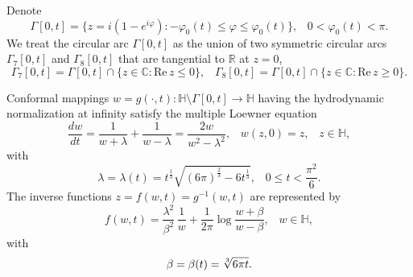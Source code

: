 \documentclass[
11pt,%
tightenlines,%
twoside,%
onecolumn,%
nofloats,%
nobibnotes,%
nofootinbib,%
superscriptaddress,%
noshowpacs,%
centertags]%
{revtex4}
\begin{document}
Denote $$\Gamma[0,t]=\{z=i(1-e^{i\varphi}):-\varphi_0(t)\leq\varphi\leq\varphi_0(t)\},\;\;\;0<\varphi_0(t)<\pi.$$ We treat the circular arc $\Gamma[0,t]$ as the union of two symmetric circular arcs $\Gamma_7[0,t]$ and $\Gamma_8[0,t]$ that are tangential to $\mathbb R$ at $z=0$, $$\Gamma_7[0,t]=\Gamma[0,t]\cap\{z\in\mathbb C:\text{Re}\,z\leq0\},\;\;\;\Gamma_8[0,t]=\Gamma[0,t]\cap\{z\in\mathbb C:\text{Re}\,z\geq0\}.$$

\begin{theorem}
Conformal mappings $w=g(\cdot,t):\mathbb H\setminus\Gamma[0,t]\to\mathbb H$ having the hydrodynamic normalization at infinity satisfy the multiple Loewner equation $$\frac{dw}{dt}=\frac{1}{w+\lambda}+\frac{1}{w-\lambda}=\frac{2w}{w^2-\lambda^2},\;\;\;w(z,0)=z,\;\;\;z\in\mathbb H,$$ with $$\lambda=\lambda(t)=t^{\frac{1}{3}}\sqrt{(6\pi)^{\frac{2}{3}}-6t^{\frac{1}{3}}},\;\;\;0\leq t<\frac{\pi^2}{6}.$$ The inverse functions $z=f(w,t)=g^{-1}(w,t)$ are represented by $$f(w,t)=\frac{\lambda^2}{\beta^2}\,\frac{1}{w}+\frac{1}{2\pi}\log\frac{w+\beta}{w-\beta},\;\;\;w\in\mathbb H,$$ with $$\beta=\beta(t)=\root3\of{6\pi t}.$$
\end{theorem}
\end{document}
